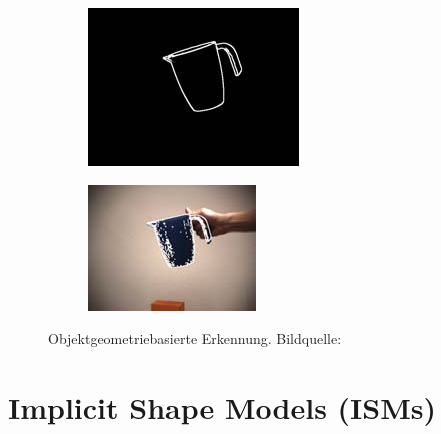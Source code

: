 \begin{figure}
\begin{center}
\begin{subfigure}[b]{.3\textwidth}
      \includegraphics[width=1\linewidth]{bilder/shape/-007.jpg}
    \end{subfigure}
    \begin{subfigure}[b]{.3\textwidth}
      \includegraphics[width=1\linewidth]{bilder/shape/-026.jpg}
    \end{subfigure}
  \end{center}
  \caption{Objektgeometriebasierte Erkennung. Bildquelle: \cite{azad20116}}\label{fig:shape-recognition}
\end{figure}

\section{Implicit Shape Models (ISMs)}

